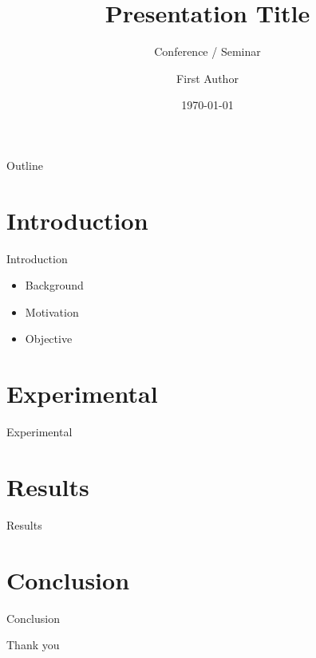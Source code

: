 \documentclass{beamer}
\title{Presentation Title}
\subtitle{Conference / Seminar}
\author{First Author}
\institute{MSPL, Sungkyunkwan University}
\date{\today}
\begin{document}
\begin{frame}
  \titlepage
\end{frame}

\begin{frame}{Outline}
  \tableofcontents
\end{frame}

\section{Introduction}
\begin{frame}{Introduction}
  \begin{itemize}
    \item Background
    \item Motivation
    \item Objective
  \end{itemize}
\end{frame}

\section{Experimental}
\begin{frame}{Experimental}
\end{frame}

\section{Results}
\begin{frame}{Results}
\end{frame}

\section{Conclusion}
\begin{frame}{Conclusion}
\end{frame}

\begin{frame}
  \centering \Large Thank you
\end{frame}
\end{document}
